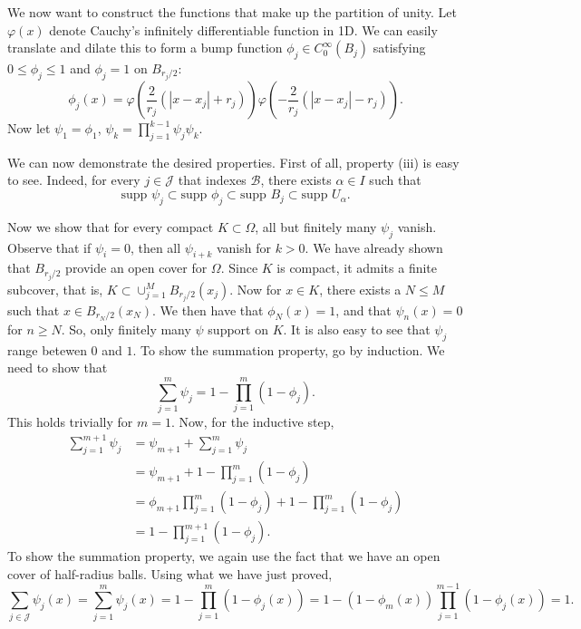 \documentclass[letterpaper,twoside,11pt]{article}
\theoremstyle{mystyle}
\begin{document}
We now want to construct the functions that make up the partition of unity. Let $\varphi(x)$ denote Cauchy's infinitely differentiable function in 1D. We can easily translate and dilate this to form a bump function $\phi_j \in C_0^\infty \left( B_j \right)$ satisfying $0 \leq \phi_j \leq 1$ and $\phi_j = 1$ on $B_{r_j/2}$:
\[\phi_j(x) = \varphi\left( \frac{2}{r_j} \left( |x-x_j| +r_j\right)  \right) \varphi\left( -\frac{2}{r_j} \left( |x-x_j| -r_j\right)  \right).\]
Now let $\psi_1 = \phi_1$, $\psi_k = \prod_{j = 1}^{k-1}\psi_j \psi_k$. 

We can now demonstrate the desired properties. 
First of all, property (iii) is easy to see. Indeed, for every $j \in \mathcal J$ that indexes $\mathcal B$, there exists $\alpha \in I$ such that 
\[\text{supp }\psi_j \subset \text{supp } \phi_j \subset \text{supp } B_j \subset \text{supp }U_\alpha.\]

Now we show that for every compact $K\subset \Omega$, all but finitely many $\psi_j$ vanish. Observe that if $\psi_i = 0$, then all $\psi_{i+k}$ vanish for $k>0$. 
We have already shown that $B_{r_j/2}$ provide an open cover for $\Omega$. Since $K$ is compact, it admits a finite subcover, that is, $K\subset \cup_{j=1}^M B_{r_j/2}(x_j)$. Now for $x \in K$, there exists a $N\leq M$ such that $x\in B_{r_N/2}(x_N)$. We then have that $\phi_N(x) = 1$, and that $\psi_n(x) = 0$ for $n\geq N$. So, only finitely many $\psi$ support on $K$. It is also easy to see that $\psi_j$ range betewen $0$ and $1$. To show the summation property, go by induction. We need to show that 
\[\sum_{j = 1 }^{m}\psi_j = 1 - \prod_{j = 1}^{m}\left( 1-\phi_j \right).\]
This holds trivially for $m = 1$. Now, for the inductive step, 
\begin{align*}
  \sum_{j = 1}^{m+1}\psi_j &= \psi_{m+1} + \sum_{j = 1}^{m}\psi_j\\ 
  &= \psi_{m+1} + 1 - \prod_{j = 1 }^{m } \left( 1-\phi_j \right) \\
  &= \phi_{m+1}\prod_{j = 1}^{m}\left( 1- \phi_j \right) + 1 - \prod_{j = 1}^{m}\left( 1-\phi_j \right)\\
  &=1-\prod_{j = 1}^{m+1}\left( 1-\phi_j \right).
\end{align*} 
To show the summation property, we again use the fact that we have an open cover of half-radius balls. Using what we have just proved, 
\[\sum_{j \in \mathcal J} \psi_j (x) = \sum_{j = 1}^{m}\psi_j(x) = 1- \prod_{j = 1 }^{m }\left( 1-\phi_j(x) \right)= 1-\left( 1-\phi_m(x) \right)\prod_{j = 1}^{m-1}\left( 1-\phi_j(x) \right) = 1.\]
\end{document}

